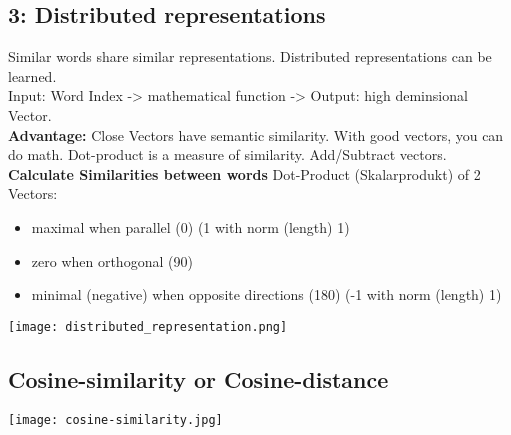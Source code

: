 \subsection{3: Distributed representations}
Similar words share similar representations.
Distributed representations can be learned.\\
Input: Word Index -> mathematical function -> Output: high deminsional Vector.\\
\textbf{Advantage:} Close Vectors have semantic similarity.
With good vectors, you can do math.
Dot-product is a measure of similarity.
Add/Subtract vectors.\\
\textbf{Calculate Similarities between words}
Dot-Product (Skalarprodukt) of 2 Vectors:
\begin{itemize}
    \item maximal when parallel (0\textdegree) (1 with norm (length) 1)
    \item zero when orthogonal (90\textdegree)
    \item minimal (negative) when opposite directions (180\textdegree) (-1 with norm (length) 1)
\end{itemize}
\texttt{[image: distributed\_representation.png]}
\subsection{Cosine-similarity or Cosine-distance}
\texttt{[image: cosine-similarity.jpg]}